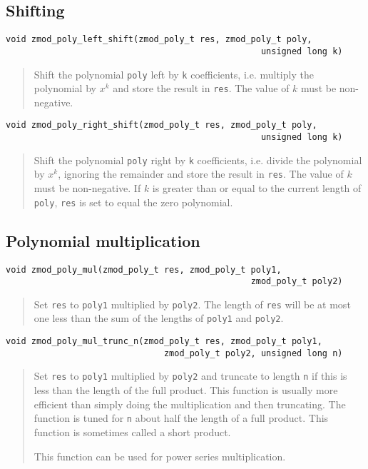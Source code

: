 \documentclass[a4paper,10pt]{article}
\newcommand{\code}{\lstinline}
\begin{document}
\subsection{Shifting}
\begin{lstlisting}
void zmod_poly_left_shift(zmod_poly_t res, zmod_poly_t poly, 
                                                  unsigned long k)
\end{lstlisting}
\begin{quote}
Shift the polynomial \code{poly} left by \code{k} coefficients, i.e. multiply the polynomial by $x^k$ and store the result in \code{res}. The value of $k$ must be non-negative.
\end{quote}

\begin{lstlisting}
void zmod_poly_right_shift(zmod_poly_t res, zmod_poly_t poly, 
                                                  unsigned long k)
\end{lstlisting}
\begin{quote}
Shift the polynomial \code{poly} right by \code{k} coefficients, i.e. divide the polynomial by $x^k$, ignoring the remainder and store the result in \code{res}. The value of $k$ must be non-negative. If $k$ is greater than or equal to the current length of \code{poly}, \code{res} is set to equal the zero polynomial.
\end{quote}

\subsection{Polynomial multiplication}
\begin{lstlisting}
void zmod_poly_mul(zmod_poly_t res, zmod_poly_t poly1, 
                                                zmod_poly_t poly2)
\end{lstlisting}
\begin{quote}
Set \code{res} to \code{poly1} multiplied by \code{poly2}. The length of \code{res} will be at most one less than the sum of the lengths of \code{poly1} and \code{poly2}.
\end{quote}

\begin{lstlisting}
void zmod_poly_mul_trunc_n(zmod_poly_t res, zmod_poly_t poly1, 
                               zmod_poly_t poly2, unsigned long n)
\end{lstlisting}
\begin{quote}
Set \code{res} to \code{poly1} multiplied by \code{poly2} and truncate to length \code{n} if this is less than the length of the full product. This function is usually more efficient than simply doing the multiplication and then truncating. The function is tuned for \code{n} about half the length of a full product. This function is sometimes called a short product.

This function can be used for power series multiplication.
\end{quote}
\end{document}
